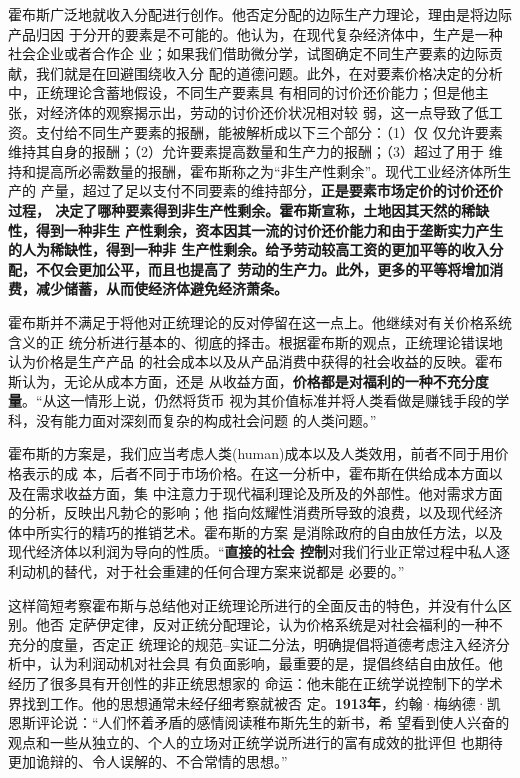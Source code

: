 霍布斯广泛地就收入分配进行创作。他否定分配的边际生产力理论，理由是将边际产品归因
于分开的要素是不可能的。他认为，在现代复杂经济体中，生产是一种社会企业或者合作企
业；如果我们借助微分学，试图确定不同生产要素的边际贡献，我们就是在回避围绕收入分
配的道德问题。此外，在对要素价格决定的分析中，正统理论含蓄地假设，不同生产要素具
有相同的讨价还价能力；但是他主张，对经济体的观察揭示出，劳动的讨价还价状况相对较
弱，这一点导致了低工资。支付给不同生产要素的报酬，能被解析成以下三个部分：（1）仅
仅允许要素维持其自身的报酬；（2）允许要素提高数量和生产力的报酬；（3）超过了用于
维持和提高所必需数量的报酬，霍布斯称之为“非生产性剩余”。现代工业经济体所生产的
产量，超过了足以支付不同要素的维持部分，\textbf{正是要素市场定价的讨价还价过程，
  决定了哪种要素得到非生产性剩余。霍布斯宣称，土地因其天然的稀缺性，得到一种非生
  产性剩余，资本因其一流的讨价还价能力和由于垄断实力产生的人为稀缺性，得到一种非
  生产性剩余。给予劳动较高工资的更加平等的收入分配，不仅会更加公平，而且也提高了
  劳动的生产力。此外，更多的平等将增加消费，减少储蓄，从而使经济体避免经济萧条。}

霍布斯并不满足于将他对正统理论的反对停留在这一点上。他继续对有关价格系统含义的正
统分析进行基本的、彻底的择击。根据霍布斯的观点，正统理论错误地认为价格是生产产品
的社会成本以及从产品消费中获得的社会收益的反映。霍布斯认为，无论从成本方面，还是
从收益方面，\textbf{价格都是对福利的一种不充分度量}。“从这一情形上说，仍然将货币
视为其价值标准并将人类看做是赚钱手段的学科，没有能力面对深刻而复杂的构成社会问题
的人类问题。”

霍布斯的方案是，我们应当考虑人类(human)成本以及人类效用，前者不同于用价格表示的成
本，后者不同于市场价格。在这一分析中，霍布斯在供给成本方面以及在需求收益方面，集
中注意力于现代福利理论及所及的外部性。他对需求方面的分析，反映出凡勃仑的影响；他
指向炫耀性消费所导致的浪费，以及现代经济体中所实行的精巧的推销艺术。霍布斯的方案
是消除政府的自由放任方法，以及现代经济体以利润为导向的性质。“\textbf{直接的社会
  控制}对我们行业正常过程中私人逐利动机的替代，对于社会重建的任何合理方案来说都是
必要的。”

这样简短考察霍布斯与总结他对正统理论所进行的全面反击的特色，并没有什么区别。他否
定萨伊定律，反对正统分配理论，认为价格系统是对社会福利的一种不充分的度量，否定正
统理论的规范--实证二分法，明确提倡将道德考虑注入经济分析中，认为利润动机对社会具
有负面影响，最重要的是，提倡终结自由放任。他经历了很多具有开创性的非正统思想家的
命运：他未能在正统学说控制下的学术界找到工作。他的思想通常未经仔细考察就被否
定。\textbf{1913年}，约翰·梅纳德·凯恩斯评论说：“人们怀着矛盾的感情阅读稚布斯先生的新书，希
望看到使人兴奋的观点和一些从独立的、个人的立场对正统学说所进行的富有成效的批评但
也期待更加诡辩的、令人误解的、不合常情的思想。”

